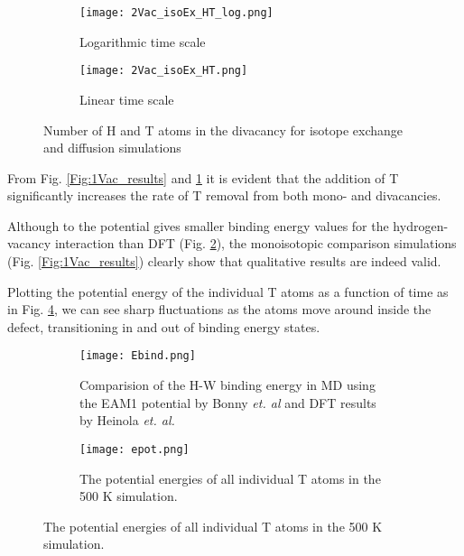 \begin{figure}[ht]
\begin{subfigure}{.5\textwidth}
  \centering
 \texttt{[image: 2Vac\_isoEx\_HT\_log.png]}  
  \caption{Logarithmic time scale}
\end{subfigure}
\begin{subfigure}{.5\textwidth}
  \centering
  \texttt{[image: 2Vac\_isoEx\_HT.png]}  
  \caption{Linear time scale}
\end{subfigure}
   \caption{Number of H and T atoms in the divacancy for isotope exchange and diffusion simulations}
   \label{Fig:2Vac_results} 
\end{figure}

From Fig. \ref{Fig:1Vac_results} and \ref{Fig:2Vac_results} it is evident that the addition of T significantly increases the rate of T removal from both mono- and divacancies. 

Although to the potential gives smaller binding energy values for the hydrogen-vacancy interaction than DFT (Fig. \ref{Fig:Ebind1H_DFT}), the monoisotopic comparison simulations (Fig. \ref{Fig:1Vac_results}) clearly show that qualitative results are indeed valid.


Plotting the potential energy of the individual T atoms as a function of time as in Fig. \ref{Fig:Epot}, we can see sharp fluctuations as the atoms move around inside the defect, transitioning in and out of binding energy states.


\begin{figure}[ht]
\begin{subfigure}{.48\textwidth}
	\center
	\texttt{[image: Ebind.png]}
	\caption{Comparision of the H-W binding energy in MD using the EAM1 potential by Bonny \textit{et. al} and DFT results by Heinola \textit{et. al. }\cite{heinolaTungstenDFT}}
	\label{Fig:Ebind1H_DFT}
\end{subfigure}
\hspace{3mm}
\begin{subfigure}{.48\textwidth}
	\center
	\texttt{[image: epot.png]}
	\caption{The potential energies of all individual T atoms in the 500 K simulation.}
	\label{Fig:Epot}
\end{subfigure}
\end{figure}



